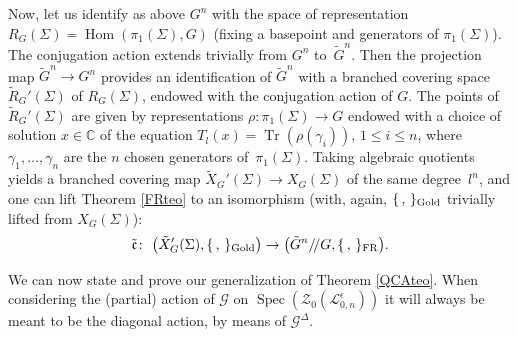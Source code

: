 \documentclass[pdftex]{sigma}%
\numberwithin{equation}{section}
\numberwithin{figure}{section}
\newcommand{\mc}{\mathbb{C}}
\newcommand{\Ll}{{\mathcal L}}
\newcommand{\ra}{\rightarrow}
\begin{document}
Now, let us identify as above $G^n$ with the space of representation $R_G(\Sigma) = \operatorname{Hom}(\pi_1(\Sigma),G)$ (fixing a basepoint and generators of $\pi_1(\Sigma)$). The conjugation action extends trivially from $G^n$ to~$\tilde G^n$. Then the projection map $\tilde G^n\ra G^n$ provides an identification of $\tilde G^n$ with a branched covering space $\tilde R_G'(\Sigma)$ of $R_G(\Sigma)$, endowed with the conjugation action of $G$. The points of~$\tilde R_G'(\Sigma)$ are given by representations $\rho\colon \pi_1(\Sigma)\ra G$ endowed with a choice of solution $x\in \mc$ of the equation $T_l(x) = \operatorname{Tr}(\rho(\gamma_i))$, $1\leq i \leq n$, where $\gamma_1,\dots,\gamma_n$ are the $n$ chosen generators of~$\pi_1(\Sigma)$. Taking algebraic quotients yields a branched covering map $\tilde X_G'(\Sigma)\ra X_G(\Sigma)$ of the same degree~$l^n$, and one can lift Theorem \ref{FRteo} to an isomorphism (with, again, $\{\, ,\, \}_{\rm Gold}$ trivially lifted from $X_G(\Sigma)$):
\[
\tilde{\mathfrak{c}} \colon\ \big(\tilde X_G'(\Sigma),\{\, ,\, \}_{\rm Gold}\big) \ra
\big(\tilde G^n/\!/G,\{\, ,\, \}_{\rm FR}\big).
\]

We can now state and prove our generalization of Theorem \ref{QCAteo}. When considering the (partial) action of $\mathcal G$ on $\operatorname{Spec}(\mathcal{Z}_0(\Ll_{0,n}^\epsilon))$ it will always be meant to be the diagonal action, by means of $\mathcal G^{\Delta}$.
\end{document}
